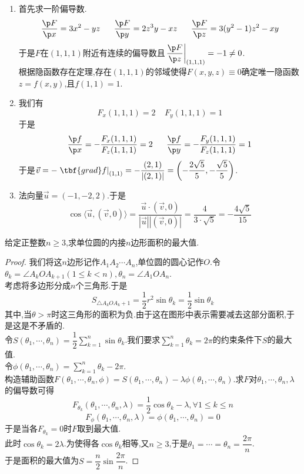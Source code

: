 \documentclass{ctexart}
\begin{document}
\begin{solution}
    \begin{enumerate}[label=\textbf{(\arabic*)},leftmargin=*]
        \item 首先求一阶偏导数.
            \[\dfrac{\p F}{\p x}=3x^2-yz\ \ \ \ \ \dfrac{\p F}{\p y}=2z^3y-xz\ \ \ \ \ \dfrac{\p F}{\p z}=3(y^2-1)z^2-xy\]
            于是$F$在$(1,1,1)$附近有连续的偏导数且$\left.\dfrac{\p F}{\p z}\right|_{(1,1,1)}=-1\neq0$.\\
            根据隐函数存在定理,存在$(1,1,1)$的邻域使得$F(x,y,z)\equiv0$确定唯一隐函数$z=f(x,y)$,且$f(1,1)=1$.
        \item 我们有
            \[F_x(1,1,1)=2\ \ \ \ \ F_y(1,1,1)=1\]
            于是
            \[\dfrac{\p f}{\p x}=-\dfrac{F_x(1,1,1)}{F_z(1,1,1)}=2\ \ \ \ \ \dfrac{\p f}{\p y}=-\dfrac{F_y(1,1,1)}{F_z(1,1,1)}=1\]
            于是$\vec{v}=-\left.\tbf{grad}f\right|_{(1,1)}=-\dfrac{(2,1)}{\left|(2,1)\right|}=\left(-\dfrac{2\sqrt5}{5},-\dfrac{\sqrt5}{5}\right)$.
        \item 法向量$\vec{u}=(-1,-2,2)$.于是
            \[\cos\langle\vec{u},(\vec{v},0)\rangle=\dfrac{\vec{u}\cdot(\vec{v},0)}{|\vec{u}||(\vec{v},0)|}=\dfrac{4}{3\cdot\sqrt{5}}=-\dfrac{4\sqrt5}{15}\]
    \end{enumerate}
\end{solution}
\begin{problem}[7.(10\songti{分})]
    给定正整数$n\geqslant 3$,求单位圆的内接$n$边形面积的最大值.
\end{problem}
\begin{proof}
    我们将这$n$边形记作$A_1A_2\cdots A_n$,单位圆的圆心记作$O$.令$\theta_k=\angle A_kOA_{k+1}(1\leqslant k<n),\theta_n=\angle A_1OA_n$.\\
    考虑将多边形分成$n$个三角形.于是
    \[S_{\triangle A_kOA_k+1}=\dfrac12r^2\sin\theta_k=\dfrac12\sin\theta_k\]
    其中,当$\theta>\pi$时这三角形的面积为负.由于这在图形中表示需要减去这部分面积,于是这是不矛盾的.\\
    令$\displaystyle S(\theta_1,\cdots,\theta_n)=\dfrac12\sum_{k=1}^n\sin\theta_k$.我们要求$\displaystyle\sum_{k=1}^n\theta_k=2\pi$的约束条件下$S$的最大值.\\
    令$\displaystyle\phi(\theta_1,\cdots,\theta_n)=\sum_{k=1}^n\theta_k-2\pi$.\\
    构造辅助函数$\displaystyle F(\theta_1,\cdots,\theta_n,\phi)=S(\theta_1,\cdots,\theta_n)-\lambda\phi(\theta_1,\cdots,\theta_n)$.求$F$对$\theta_1,\cdots,\theta_n,\lambda$的偏导数可得
    \[F_{\theta_k}(\theta_1,\cdots,\theta_n,\lambda)=\dfrac{1}{2}\cos\theta_k-\lambda,\forall 1\leqslant k\leqslant n\]
    \[F_{\phi}(\theta_1,\cdots,\theta_n,\lambda)=\phi(\theta_1,\cdots,\theta_n)=0\]
    于是当各$F_{\theta_k}=0$时$F$取到最大值.\\
    此时$\cos\theta_k=2\lambda$.为使得各$\cos\theta_k$相等,又$n\geqslant3$,于是$\theta_1=\cdots=\theta_n=\dfrac{2\pi}{n}$.\\
    于是面积的最大值为$S=\dfrac{n}{2}\sin\dfrac{2\pi}{n}$.
\end{proof}
\end{document}
